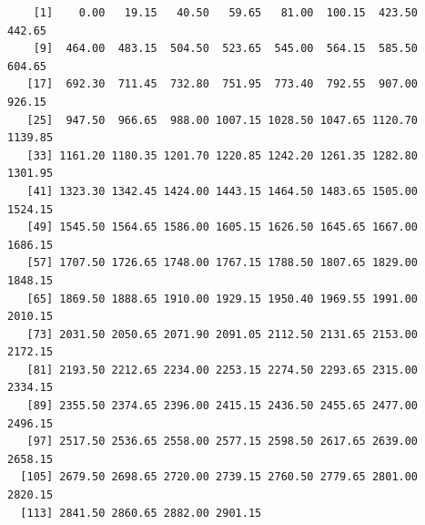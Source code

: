 \documentclass[12pt,twoside]{reedthesis}
\begin{document}
  \begin{Shaded}
  \begin{Highlighting}[]
  
  \NormalTok{a<-tablePRA$Time[}\NormalTok{(}\NormalTok{,}\NormalTok{)]}
  \NormalTok{b<-tablePRA$Time[}\NormalTok{(}\NormalTok{,}\NormalTok{)]+}
  
  \NormalTok{tablePRA$Time[}\NormalTok{(}\NormalTok{, }\NormalTok{)] <-}\StringTok{ }
  \NormalTok{tablePRA$Time[}\NormalTok{(}\NormalTok{, }\NormalTok{)] <-}\StringTok{ }
  \end{Highlighting}
  \end{Shaded}
  
  \begin{verbatim}
    [1]    0.00   19.15   40.50   59.65   81.00  100.15  423.50  442.65
    [9]  464.00  483.15  504.50  523.65  545.00  564.15  585.50  604.65
   [17]  692.30  711.45  732.80  751.95  773.40  792.55  907.00  926.15
   [25]  947.50  966.65  988.00 1007.15 1028.50 1047.65 1120.70 1139.85
   [33] 1161.20 1180.35 1201.70 1220.85 1242.20 1261.35 1282.80 1301.95
   [41] 1323.30 1342.45 1424.00 1443.15 1464.50 1483.65 1505.00 1524.15
   [49] 1545.50 1564.65 1586.00 1605.15 1626.50 1645.65 1667.00 1686.15
   [57] 1707.50 1726.65 1748.00 1767.15 1788.50 1807.65 1829.00 1848.15
   [65] 1869.50 1888.65 1910.00 1929.15 1950.40 1969.55 1991.00 2010.15
   [73] 2031.50 2050.65 2071.90 2091.05 2112.50 2131.65 2153.00 2172.15
   [81] 2193.50 2212.65 2234.00 2253.15 2274.50 2293.65 2315.00 2334.15
   [89] 2355.50 2374.65 2396.00 2415.15 2436.50 2455.65 2477.00 2496.15
   [97] 2517.50 2536.65 2558.00 2577.15 2598.50 2617.65 2639.00 2658.15
  [105] 2679.50 2698.65 2720.00 2739.15 2760.50 2779.65 2801.00 2820.15
  [113] 2841.50 2860.65 2882.00 2901.15
  \end{verbatim}
  
\end{document}
